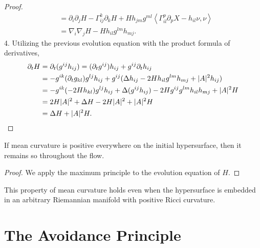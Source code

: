 \begin{proof}
\begin{align*}
& = \partial_{i}\partial_{j}H - \Gamma_{ij}^{k}\partial_{k}H + Hh_{jm}g^{ml}\left< \Gamma_{il}^{p}\partial_{p}X- h_{il}\nu, \nu \right> \\
& = \nabla_{i}\nabla_{j}H- Hh_{il}g^{lm}h_{mj}.
\end{align*}
4. Utilizing the previous evolution equation with the product formula of derivatives, 
\begin{align*}
\partial_t H &= \partial_t(g^{ij}h_{ij}) = (\partial_{t}g^{ij})h_{ij}+ g^{ij}\partial_{t}h_{ij}\\
& = -g^{ik}(\partial_{t}g_{kl})g^{lj}h_{ij}+ g^{ij}(\Delta h_{ij} - 2Hh_{il}g^{lm}h_{mj}+|A|^2h_{ij})\\
& = -g^{ik}(-2Hh_{kl})g^{lj}h_{ij}+ \Delta(g^{ij}h_{ij}) - 2Hg^{ij}g^{lm}h_{il}h_{mj}+|A|^2H\\
& = 2H|A|^2 + \Delta H - 2H|A|^2 + |A|^2H\\
& =  \Delta H+ |A|^2H.
\end{align*}
\end{proof}
\begin{corollary}
If mean curvature is positive everywhere on the initial hypersurface, then it remains so throughout the flow.
\end{corollary}
\begin{proof}
We apply the maximum principle to the evolution equation of $H$.
\end{proof}
\begin{remark}
This property of mean curvature holds even when the hypersurface is embedded in an arbitrary Riemannian manifold with positive Ricci curvature. 
\end{remark}
\section{The Avoidance Principle}

